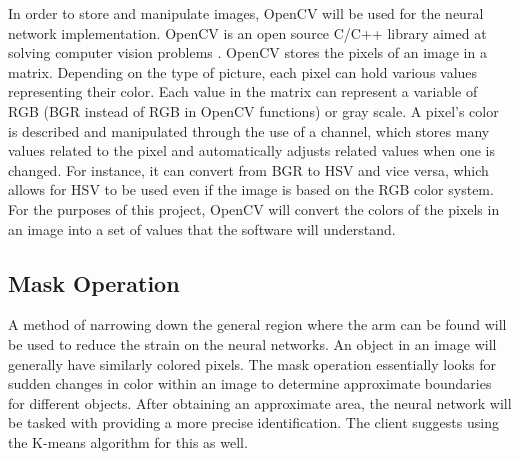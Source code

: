 \documentclass[10pt,journal,compsoc, draftclsnofoot,onecolumn]{IEEEtran}
\begin{document}
In order to store and manipulate images, OpenCV will be used for the neural network implementation.
OpenCV is an open source C/C++ library aimed at solving computer vision problems \cite{1:online}.
OpenCV stores the pixels of an image in a matrix.
Depending on the type of picture, each pixel can hold various values representing their color.
Each value in the matrix can represent a variable of RGB (BGR instead of RGB in OpenCV functions) or gray scale.
A pixel's color is described and manipulated through the use of a channel, which stores many values related to the pixel and automatically adjusts related values when one is changed.
For instance, it can convert from BGR to HSV and vice versa, which allows for HSV to be used even if the image is based on the RGB color system.
For the purposes of this project, OpenCV will convert the colors of the pixels in an image into a set of values that the software will understand.

\subsection{Mask Operation}
A method of narrowing down the general region where the arm can be found will be used to reduce the strain on the neural networks.
An object in an image will generally have similarly colored pixels.
The mask operation essentially looks for sudden changes in color within an image to determine approximate boundaries for different objects.
After obtaining an approximate area, the neural network will be tasked with providing a more precise identification.
The client suggests using the K-means algorithm for this as well.
\end{document}

